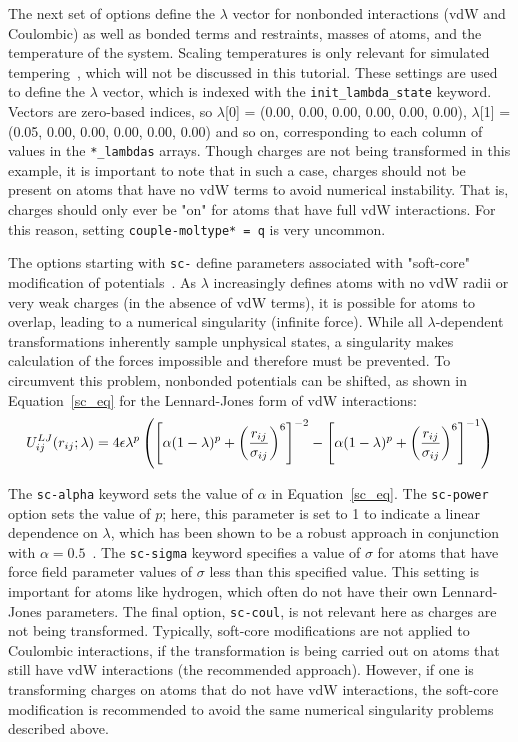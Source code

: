 \documentclass[9pt,tutorial]{livecoms}
\begin{document}
The next set of options define the $\lambda$ vector for nonbonded interactions (vdW and Coulombic) as well as bonded terms and restraints, masses of atoms, and the temperature of the system. Scaling temperatures is only relevant for simulated tempering~\cite{Marinari1992,Geyer1995}, which will not be discussed in this tutorial. These settings are used to define the $\lambda$ vector, which is indexed with the \texttt{init\_lambda\_state} keyword. Vectors are zero-based indices, so $\lambda$[0] = (0.00, 0.00, 0.00, 0.00, 0.00, 0.00), $\lambda$[1] = (0.05, 0.00, 0.00, 0.00, 0.00, 0.00) and so on, corresponding to each column of values in the \texttt{*\_lambdas} arrays. Though charges are not being transformed in this example, it is important to note that in such a case, charges should not be present on atoms that have no vdW terms to avoid numerical instability. That is, charges should only ever be "on" for atoms that have full vdW interactions. For this reason, setting \texttt{couple-moltype* = q} is very uncommon.

The options starting with \texttt{sc-} define parameters associated with "soft-core" modification of potentials~\cite{Beutler1994}. As $\lambda$ increasingly defines atoms with no vdW radii or very weak charges (in the absence of vdW terms), it is possible for atoms to overlap, leading to a numerical singularity (infinite force). While all $\lambda$-dependent transformations inherently sample unphysical states, a singularity makes calculation of the forces impossible and therefore must be prevented. To circumvent this problem, nonbonded potentials can be shifted, as shown in Equation~\ref{sc_eq} for the Lennard-Jones form of vdW interactions: 
\begin{equation} \label{sc_eq}
\footnotesize
U_{ij}^{LJ} (r_{ij};\lambda) = 4\epsilon\lambda^p\left(\left[\alpha(1-\lambda)^p + \left(\frac{r_{ij}}{\sigma_{ij}}\right)^6\right]^{-2} - \left[\alpha(1-\lambda)^p + \left(\frac{r_{ij}}{\sigma_{ij}}\right)^6\right]^{-1}\right)
\end{equation}

The \texttt{sc-alpha} keyword sets the value of $\alpha$ in Equation~\ref{sc_eq}. The \texttt{sc-power} option sets the value of $p$; here, this parameter is set to 1 to indicate a linear dependence on $\lambda$, which has been shown to be a robust approach in conjunction with $\alpha = 0.5$~\cite{Pitera2002,Steinbrecher2007,Shirts2005}. The \texttt{sc-sigma} keyword specifies a value of $\sigma$ for atoms that have force field parameter values of $\sigma$ less than this specified value. This setting is important for atoms like hydrogen, which often do not have their own Lennard-Jones parameters. The final option, \texttt{sc-coul}, is not relevant here as charges are not being transformed. Typically, soft-core modifications are not applied to Coulombic interactions, if the transformation is being carried out on atoms that still have vdW interactions (the recommended approach). However, if one is transforming charges on atoms that do not have vdW interactions, the soft-core modification is recommended to avoid the same numerical singularity problems described above.
\end{document}
